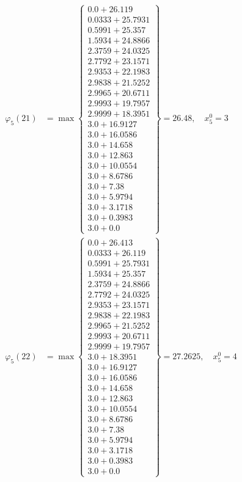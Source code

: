 \documentclass{article}
\begin{document}
\begin{align*}
  
  
  
\varphi_{5}(21) &= \max \left\{ \begin{array}{c}
0.0 + 26.119 \\
 0.0333 + 25.7931 \\
 0.5991 + 25.357 \\
 1.5934 + 24.8866 \\
 2.3759 + 24.0325 \\
 2.7792 + 23.1571 \\
 2.9353 + 22.1983 \\
 2.9838 + 21.5252 \\
 2.9965 + 20.6711 \\
 2.9993 + 19.7957 \\
 2.9999 + 18.3951 \\
 3.0 + 16.9127 \\
 3.0 + 16.0586 \\
 3.0 + 14.658 \\
 3.0 + 12.863 \\
 3.0 + 10.0554 \\
 3.0 + 8.6786 \\
 3.0 + 7.38 \\
 3.0 + 5.9794 \\
 3.0 + 3.1718 \\
 3.0 + 0.3983 \\
 3.0 + 0.0
\end{array} \right\}=26.48,\quad x_{5}^0=3\\
  
  
  
  
\varphi_{5}(22) &= \max \left\{ \begin{array}{c}
0.0 + 26.413 \\
 0.0333 + 26.119 \\
 0.5991 + 25.7931 \\
 1.5934 + 25.357 \\
 2.3759 + 24.8866 \\
 2.7792 + 24.0325 \\
 2.9353 + 23.1571 \\
 2.9838 + 22.1983 \\
 2.9965 + 21.5252 \\
 2.9993 + 20.6711 \\
 2.9999 + 19.7957 \\
 3.0 + 18.3951 \\
 3.0 + 16.9127 \\
 3.0 + 16.0586 \\
 3.0 + 14.658 \\
 3.0 + 12.863 \\
 3.0 + 10.0554 \\
 3.0 + 8.6786 \\
 3.0 + 7.38 \\
 3.0 + 5.9794 \\
 3.0 + 3.1718 \\
 3.0 + 0.3983 \\
 3.0 + 0.0
\end{array} \right\}=27.2625,\quad x_{5}^0=4\\
  

\end{align*}
\end{document}
